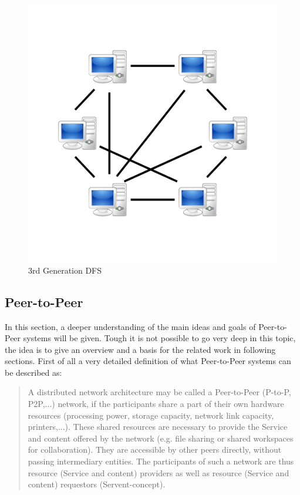 	\begin{figure}[H]
		\begin{center}
		\includegraphics[scale=0.2]{Talk5/3rd_gen_dfs.PNG}
		\end{center}
		\caption{3rd Generation DFS \cite{wikimedia:p2p}}
		\label{3rd_gen_dfs}
	\end{figure}

\subsection{Peer-to-Peer}
In this section, a deeper understanding of the main ideas and goals of Peer-to-Peer systems will be given. Tough it is not possible to go very deep in this topic, the idea is to give an overview and a basis for the related work in following sections. First of all a very detailed definition of what Peer-to-Peer systems can be described as:
\begin{quote}
A distributed network architecture may be called a Peer-to-Peer (P-to-P, P2P,...) network, if the participants share a part of their own hardware resources (processing power, storage capacity, network link capacity, printers,...). These shared resources are necessary to provide the Service and content offered by the network (e.g. file sharing or shared workspaces for collaboration). They are accessible by other peers directly, without passing intermediary entities. The participants of such a network are thus resource (Service and content) providers as well as resource (Service and content) requestors (Servent-concept).\cite{ptp:definition}
\end{quote}

